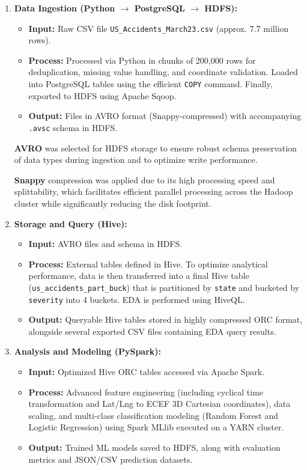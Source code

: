 \documentclass[11pt,a4paper]{article}
\begin{document}
\begin{enumerate}
    \item \textbf{Data Ingestion (Python $\rightarrow$ PostgreSQL $\rightarrow$ HDFS):}
    \begin{itemize}
        \item \textbf{Input:} Raw CSV file \texttt{US\_Accidents\_March23.csv} (approx. 7.7 million rows).
        \item \textbf{Process:} Processed via Python in chunks of 200,000 rows for deduplication, missing value handling, and coordinate validation. Loaded into PostgreSQL tables using the efficient \texttt{COPY} command. Finally, exported to HDFS using Apache Sqoop.
        \item \textbf{Output:} Files in AVRO format (Snappy-compressed) with accompanying \texttt{.avsc} schema in HDFS.
    \end{itemize}
    \textbf{AVRO} was selected for HDFS storage to ensure robust schema preservation of data types during ingestion and to optimize write performance.
    
    \textbf{Snappy} compression was applied due to its high processing speed and splittability, which facilitates efficient parallel processing across the Hadoop cluster while significantly reducing the disk footprint.

    \item \textbf{Storage and Query (Hive):}
    \begin{itemize}
        \item \textbf{Input:} AVRO files and schema in HDFS.
        \item \textbf{Process:} External tables defined in Hive. To optimize analytical performance, data is then transferred into a final Hive table (\texttt{us\_accidents\_part\_buck}) that is partitioned by \texttt{state} and bucketed by \texttt{severity} into 4 buckets. EDA is performed using HiveQL.
        \item \textbf{Output:} Queryable Hive tables stored in highly compressed ORC format, alongside several exported CSV files containing EDA query results.
    \end{itemize}

    \item \textbf{Analysis and Modeling (PySpark):}
    \begin{itemize}
        \item \textbf{Input:} Optimized Hive ORC tables accessed via Apache Spark.
        \item \textbf{Process:} Advanced feature engineering (including cyclical time transformation and Lat/Lng to ECEF 3D Cartesian coordinates), data scaling, and multi-class classification modeling (Random Forest and Logistic Regression) using Spark MLlib executed on a YARN cluster.
        \item \textbf{Output:} Trained ML models saved to HDFS, along with evaluation metrics and JSON/CSV prediction datasets.
    \end{itemize}


\end{enumerate}
\end{document}
